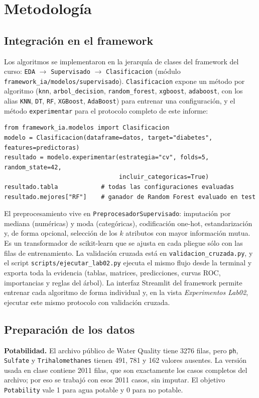 \section{Metodología}

\subsection{Integración en el framework}
Los algoritmos se implementaron en la jerarquía de clases del framework del curso:
\texttt{EDA} $\rightarrow$ \texttt{Supervisado} $\rightarrow$ \texttt{Clasificacion}
(módulo \texttt{framework\_ia/modelos/supervisado}). \texttt{Clasificacion} expone un
método por algoritmo (\texttt{knn}, \texttt{arbol\_decision}, \texttt{random\_forest},
\texttt{xgboost}, \texttt{adaboost}, con los alias \texttt{KNN}, \texttt{DT},
\texttt{RF}, \texttt{XGBoost}, \texttt{AdaBoost}) para entrenar una configuración, y el
método \texttt{experimentar} para el protocolo completo de este informe:

\begin{verbatim}
from framework_ia.modelos import Clasificacion
modelo = Clasificacion(dataframe=datos, target="diabetes", features=predictoras)
resultado = modelo.experimentar(estrategia="cv", folds=5, random_state=42,
                                incluir_categoricas=True)
resultado.tabla            # todas las configuraciones evaluadas
resultado.mejores["RF"]    # ganador de Random Forest evaluado en test
\end{verbatim}

El preprocesamiento vive en \texttt{PreprocesadorSupervisado}: imputación por mediana
(numéricas) y moda (categóricas), codificación one-hot, estandarización y, de forma
opcional, selección de los $k$ atributos con mayor información mutua. Es un
transformador de scikit-learn \cite{pedregosa} que se ajusta en cada pliegue sólo con
las filas de entrenamiento. La validación cruzada está en
\texttt{validacion\_cruzada.py}, y el script \texttt{scripts/ejecutar\_lab02.py} ejecuta
el mismo flujo desde la terminal y exporta toda la evidencia (tablas, matrices,
predicciones, curvas ROC, importancias y reglas del árbol). La interfaz Streamlit del
framework permite entrenar cada algoritmo de forma individual y, en la vista
\emph{Experimentos Lab02}, ejecutar este mismo protocolo con validación cruzada.

\subsection{Preparación de los datos}
\textbf{Potabilidad.} El archivo público de Water Quality \cite{datospotabilidad} tiene
3276 filas, pero \texttt{ph}, \texttt{Sulfate} y \texttt{Trihalomethanes} tienen 491,
781 y 162 valores ausentes. La versión usada en clase contiene 2011 filas, que son
exactamente los casos completos del archivo; por eso se trabajó con esos 2011 casos,
sin imputar. El objetivo \texttt{Potability} vale 1 para agua potable y 0 para no potable.

